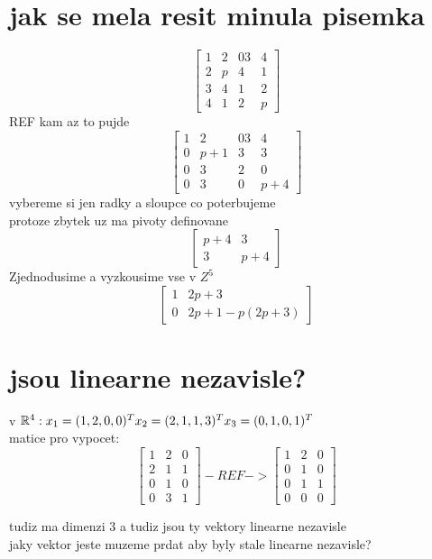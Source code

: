 \documentclass[a4paper]{article}
\begin{document}
\section{jak se mela resit minula pisemka}
$$
\begin{bmatrix}
    1 & 2 & 03 & 4 \\
	2 & p & 4  & 1  \\
    3 & 4 & 1 &2   \\
    4 &1 &2 & p 
\end{bmatrix}
$$
REF kam az to pujde
$$
\begin{bmatrix}
    1 & 2 & 03 & 4 \\
	0 & p+1 & 3  & 3  \\
    0 & 3 & 2 &0   \\
    0 &3 &0 & p+4 
\end{bmatrix}
$$
vybereme si jen radky a sloupce co poterbujeme\\
protoze zbytek uz ma pivoty definovane
$$
\begin{bmatrix}
    p+4 & 3 \\
	3 & p+4
\end{bmatrix}
$$
Zjednodusime a vyzkousime vse v $Z^5$
$$
\begin{bmatrix}
    1 & 2p+3 \\
	0 & 2p+1-p(2p+3)
\end{bmatrix}
$$
\section{jsou linearne nezavisle?}
v $\mathbb{R}^4: \\
x_1=(1,2,0,0)^T \\
x_2=(2,1,1,3)^T \\
x_3=(0,1,0,1)^T
$
\\
matice pro vypocet:
$$
\begin{bmatrix}
    1 & 2 & 0 \\
    2 & 1 & 1 \\
    0 & 1 & 0 \\
    0 & 3 & 1 
\end{bmatrix}
-REF->
\begin{bmatrix}
    1 & 2 & 0 \\
    0 & 1 & 0 \\
    0 & 1 & 1 \\
    0 & 0 & 0 
\end{bmatrix}
$$

tudiz ma dimenzi 3 a tudiz jsou ty vektory linearne nezavisle
\\
jaky vektor jeste muzeme prdat aby byly stale linearne nezavisle?
\end{document}
